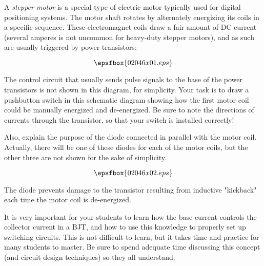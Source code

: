 

A {\it stepper motor} is a special type of electric motor typically used for digital positioning systems.  The motor shaft rotates by alternately energizing its coils in a specific sequence.  These electromagnet coils draw a fair amount of DC current (several amperes is not uncommon for heavy-duty stepper motors), and as such are usually triggered by power transistors:

$$\epsfbox{02046x01.eps}$$

The control circuit that usually sends pulse signals to the base of the power transistors is not shown in this diagram, for simplicity.  Your task is to draw a pushbutton switch in this schematic diagram showing how the first motor coil could be manually energized and de-energized.  Be sure to note the directions of currents through the transistor, so that your switch is installed correctly!

Also, explain the purpose of the diode connected in parallel with the motor coil.  Actually, there will be one of these diodes for each of the motor coils, but the other three are not shown for the sake of simplicity.







$$\epsfbox{02046x02.eps}$$

The diode prevents damage to the transistor resulting from inductive "kickback" each time the motor coil is de-energized.







It is very important for your students to learn how the base current controls the collector current in a BJT, and how to use this knowledge to properly set up switching circuits.  This is not difficult to learn, but it takes time and practice for many students to master.  Be sure to spend adequate time discussing this concept (and circuit design techniques) so they all understand.




